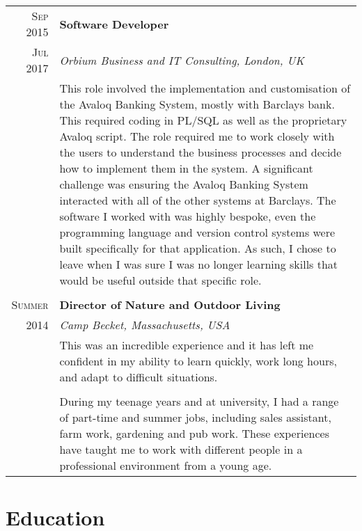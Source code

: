 \documentclass[a4paper,10pt]{article} %
\begin{document}
\begin{tabular}{r|p{16.5cm}}
\textsc{Sep 2015} &  \textbf{Software Developer} \\
\textsc{Jul 2017} & \emph{Orbium Business and IT Consulting, London, UK }\\
& \footnotesize{ This role involved the implementation and customisation of the Avaloq Banking System, mostly with Barclays bank. This required coding in PL/SQL as well as the proprietary Avaloq script. The role required me to work closely with the users to understand the business processes and decide how to implement them in the system. A significant challenge was ensuring the Avaloq Banking System interacted with all of the other systems at Barclays. The software I worked with was highly bespoke, even the programming language and version control systems were built specifically for that application. As such, I chose to leave when I was sure I was no longer learning skills that would be useful outside that specific role.} \\
\multicolumn{2}{c}{} \\


\textsc{Summer} &  \textbf{Director of Nature and Outdoor Living} \\
\textsc{2014} & \emph{Camp Becket, Massachusetts, USA }\\
& \footnotesize{This was an incredible experience and it has left me confident in my ability to learn quickly, work long hours, and adapt to difficult situations.} \\
\multicolumn{2}{c}{} \\


& \footnotesize{During my teenage years and at university, I had a range of part-time and summer jobs, including sales assistant, farm work, gardening and pub work. These experiences have taught me to work with different people in a professional environment from a young age. } \\
\end{tabular}


\section{Education}
\end{document}
